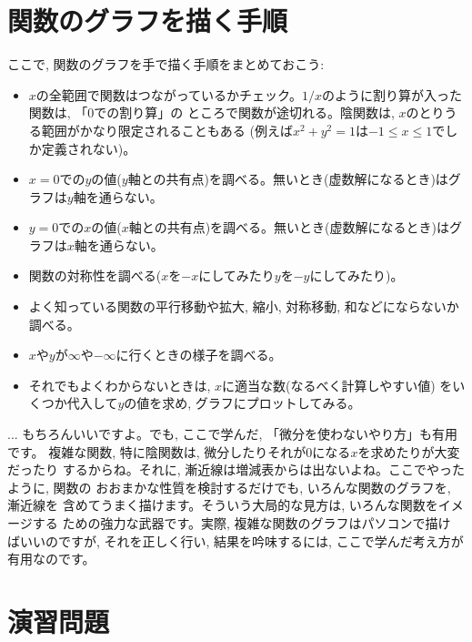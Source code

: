 \section{関数のグラフを描く手順}
ここで, 関数のグラフを手で描く手順をまとめておこう:
\begin{itemize}
\item $x$の全範囲で関数はつながっているかチェック。$1/x$のように割り算が入った関数は, 「0での割り算」の
ところで関数が途切れる。陰関数は, $x$のとりうる範囲がかなり限定されることもある
(例えば$x^2+y^2=1$は$-1\le x \le 1$でしか定義されない)。
\item $x=0$での$y$の値($y$軸との共有点)を調べる。無いとき(虚数解になるとき)はグラフは$y$軸を通らない。
\item $y=0$での$x$の値($x$軸との共有点)を調べる。無いとき(虚数解になるとき)はグラフは$x$軸を通らない。
\item 関数の対称性を調べる($x$を$-x$にしてみたり$y$を$-y$にしてみたり)。
\item よく知っている関数の平行移動や拡大, 縮小, 対称移動, 和などにならないか調べる。
\item $x$や$y$が$\infty$や$-\infty$に行くときの様子を調べる。
\item それでもよくわからないときは, $x$に適当な数(なるべく計算しやすい値)
をいくつか代入して$y$の値を求め, グラフにプロットしてみる。
\end{itemize}

\begin{faq}{\small{}
... もちろんいいですよ。でも, ここで学んだ, 「微分を使わないやり方」も有用です。
複雑な関数, 特に陰関数は, 微分したりそれが0になる$x$を求めたりが大変だったり
するからね。それに, 漸近線は増減表からは出ないよね。ここでやったように, 関数の
おおまかな性質を検討するだけでも, いろんな関数のグラフを, 漸近線を
含めてうまく描けます。そういう大局的な見方は, いろんな関数をイメージする
ための強力な武器です。実際, 複雑な関数のグラフはパソコンで描け
ばいいのですが, それを正しく行い, 結果を吟味するには, 
ここで学んだ考え方が有用なのです。}\end{faq}
\hv


\section*{演習問題}

